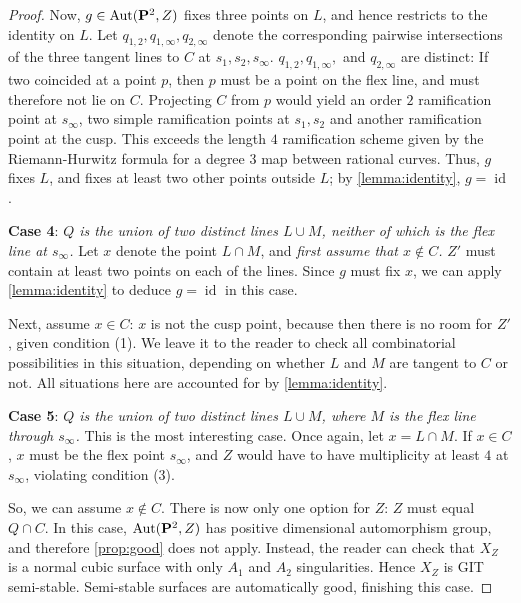 \documentclass[12pt,reqno]{amsart}
\DeclareMathOperator{\id}{id}
\numberwithin{equation}{section}
\begin{document}
\begin{proof}
  
  Now, $g \in \operatorname{Aut}({\bf P}^{2},Z)$ fixes three points on $L$, and hence
  restricts to the identity on $L$. Let
  $q_{1,2}, q_{1, \infty}, q_{2,\infty}$ denote the corresponding
  pairwise intersections of the three tangent lines to $C$ at
  $s_1, s_2, s_{\infty}$. $q_{1,2}, q_{1, \infty},$ and
  $ q_{2,\infty}$ are distinct: If two coincided at a point $p$, then
  $p$ must be a point on the flex line, and must therefore not lie on
  $C$. Projecting $C$ from $p$ would yield an order $2$ ramification
  point at $s_{\infty}$, two simple ramification points at 
  $s_{1}, s_{2}$ and another ramification point at the cusp.  This
  exceeds the length $4$ ramification scheme given by the
  Riemann-Hurwitz formula for a degree $3$ map between rational
  curves.  Thus, $g$ fixes $L$, and fixes at least two other points
  outside $L$; by \autoref{lemma:identity}, $g =\id$.

  
  {\bf Case 4}: {\sl $Q$ is the union of two distinct lines
    $L \cup M$, neither of which is the flex line at $s_{\infty}$.}
  Let $x$ denote the point $L \cap M$, and {\sl first assume that
    $x \notin C$.} $Z'$ must contain at least two points on each of
  the lines. Since $g$ must fix $x$, we can apply
  \autoref{lemma:identity} to deduce $g =\id$ in this case.

  Next, assume $x \in C$: $x$ is not the cusp point, because then
  there is no room for $Z'$, given condition (1). We leave it to the
  reader to check all combinatorial possibilities in this situation,
  depending on whether $L$ and $M$ are tangent to $C$ or not.  All
  situations here are accounted for by \autoref{lemma:identity}.

  {\bf Case 5}: {\sl $Q$ is the union of two distinct lines
    $L \cup M$, where $M$ is the flex line through $s_{\infty}$.} This
  is the most interesting case.  Once again, let $x = L\cap M$.  If
  $x \in C$, $x$ must be the flex point $s_{\infty}$, and $Z$ would
  have to have multiplicity at least $4$ at $s_{\infty}$, violating
  condition (3).

  So, we can assume $x \notin C$.  There is now only one option for
  $Z$: $Z$ must equal $Q \cap C$.  In this case, $\operatorname{Aut}({\bf P}^{2}, Z)$ has
  positive dimensional automorphism group, and therefore
  \autoref{prop:good} does not apply.  Instead, the reader can check
  that $X_{Z}$ is a normal cubic surface with only $A_{1}$ and $A_{2}$
  singularities.  Hence $X_{Z}$ is GIT semi-stable.  Semi-stable
  surfaces are automatically good, finishing this case.
  
\end{proof}
\end{document}
